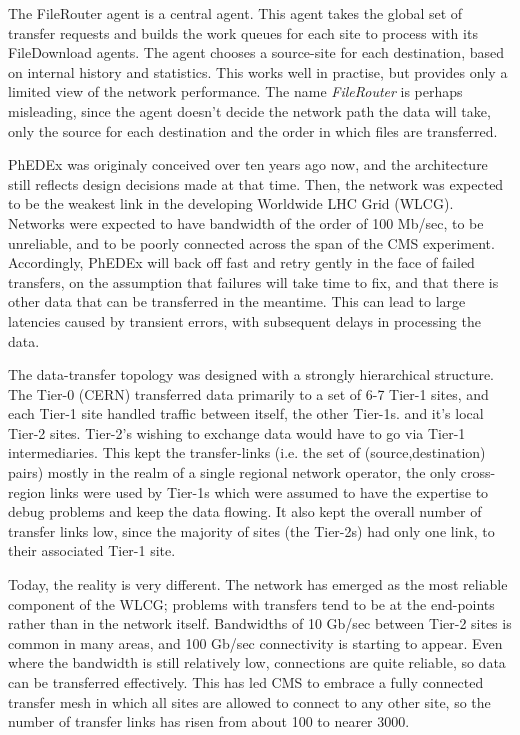 The FileRouter agent is a central agent. This agent takes the global set of transfer requests and builds the work queues for each site to process with its FileDownload agents. The agent chooses a source-site for each destination, based on internal history and statistics. This works well in practise, but provides only a limited view of the network performance. The name \emph{FileRouter} is perhaps misleading, since the agent doesn't decide the network path the data will take, only the source for each destination and the order in which files are transferred.

PhEDEx was originaly conceived over ten years ago now, and the architecture still reflects design decisions made at that time. Then, the network was expected to be the weakest link in the developing Worldwide LHC Grid (WLCG)\cite{WLCG}. Networks were expected to have bandwidth of the order of 100 Mb/sec, to be unreliable, and to be poorly connected across the span of the CMS experiment. Accordingly, PhEDEx will back off fast and retry gently in the face of failed transfers, on the assumption that failures will take time to fix, and that there is other data that can be transferred in the meantime. This can lead to large latencies caused by transient errors, with subsequent delays in processing the data.

The data-transfer topology was designed with a strongly hierarchical structure. The Tier-0 (CERN) transferred data primarily to a set of 6-7 Tier-1 sites, and each Tier-1 site handled traffic between itself, the other Tier-1s. and it's local Tier-2 sites. Tier-2's wishing to exchange data would have to go via Tier-1 intermediaries. This kept the transfer-links (i.e. the set of (source,destination) pairs) mostly in the realm of a single regional network operator, the only cross-region links were used by Tier-1s which were assumed to have the expertise to debug problems and keep the data flowing. It also kept the overall number of transfer links low, since the majority of sites (the Tier-2s) had only one link, to their associated Tier-1 site.

Today, the reality is very different. The network has emerged as the most reliable component of the WLCG; problems with transfers tend to be at the end-points rather than in the network itself. Bandwidths of 10 Gb/sec between Tier-2 sites is common in many areas, and 100 Gb/sec connectivity is starting to appear. Even where the bandwidth is still relatively low, connections are quite reliable, so data can be transferred effectively. This has led CMS to embrace a fully connected transfer mesh in which all sites are allowed to connect to any other site, so the number of transfer links has risen from about 100 to nearer 3000.
